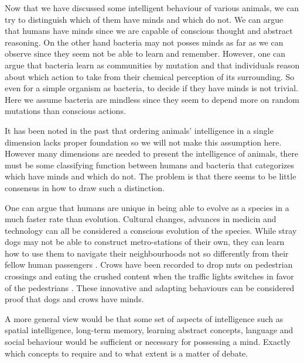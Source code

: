 \documentclass[11pt]{article}
\newenvironment{draft}{\color{dark-cornflower-blue-2}}{\ignorespacesafterend}
\begin{document}
\begin{draft}
Now that we have discussed some intelligent behaviour of various animals, we can try to distinguish which of them have minds and which do not. We can argue that humans have minds since we are capable of conscious thought and abstract reasoning. On the other hand bacteria may not posses minds as far as we can observe since they seem not be able to learn and remember. However, one can argue that bacteria learn as communities by mutation and that individuals reason about which action to take from their chemical perception of its surrounding. So even for a simple organism as bacteria, to decide if they have minds is not trivial. Here we assume bacteria are mindless since they seem to depend more on random mutations than conscious actions.

It has been noted in the past that ordering animals' intelligence in a single dimension lacks proper foundation \cite{mackintosh1988animals} so we will not make this assumption here. However many dimensions are needed to present the intelligence of animals, there must be some classifying function between humans and bacteria that categorizes which have minds and which do not. The problem is that there seems to be little consensus in how to draw such a distinction.

One can argue that humans are unique in being able to evolve as a species in a much faster rate than evolution. Cultural changes, advances in medicin and technology can all be considered a conscious evolution of the species. While stray dogs may not be able to construct metro-stations of their own, they can learn how to use them to navigate their neighbourhoods not so differently from their fellow human passengers \cite{moskowDogs}. Crows have been recorded to drop nuts on pedestrian crossings and eating the crushed content when the traffic lights switches in favor of the pedestrians \cite{crowNuts}. These innovative and adapting behaviours can be considered proof that dogs and crows have minds.


A more general view would be that some set of aspects of intelligence such as spatial intelligence, long-term memory, learning abstract concepts, language and social behaviour would be sufficient or necessary for possessing a mind. Exactly which concepts to require and to what extent is a matter of debate.

\end{draft}
\end{document}
